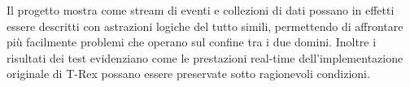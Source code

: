 Il progetto mostra come stream di eventi e collezioni di dati possano in effetti essere descritti con astrazioni logiche del tutto simili, permettendo di affrontare più facilmente problemi che operano sul confine tra i due domini. Inoltre i risultati dei test evidenziano come le prestazioni real-time dell'implementazione originale di T-Rex possano essere preservate sotto ragionevoli condizioni.
